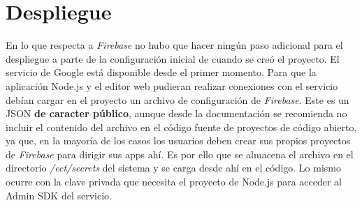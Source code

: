 \begin{table}[H]
\label{FIX-08}
\end{table}

\begin{table}[H]
\label{FIX-09}
\end{table}

\section{Despliegue}

En lo que respecta a \textit{Firebase} no hubo que hacer ningún paso adicional para el despliegue a parte de la configuración inicial de cuando se creó el proyecto. El servicio de Google está disponible desde el primer momento. Para que la aplicación Node.js y el editor web pudieran realizar conexiones con el servicio debían cargar en el proyecto un archivo de configuración de \textit{Firebase}. Este es un JSON \textbf{de caracter público}, aunque desde la documentación se recomienda no incluir el contenido del archivo en el código fuente de proyectos de código abierto, ya que, en la mayoría de los casos los usuarios deben crear sus propios proyectos de \textit{Firebase} para dirigir sus apps ahí. Es por ello que se almacena el archivo en el directorio \textit{/ect/secrets} del sistema y se carga desde ahí en el código. Lo mismo ocurre con la clave privada que necesita el proyecto de Node.js para acceder al Admin SDK del servicio.

